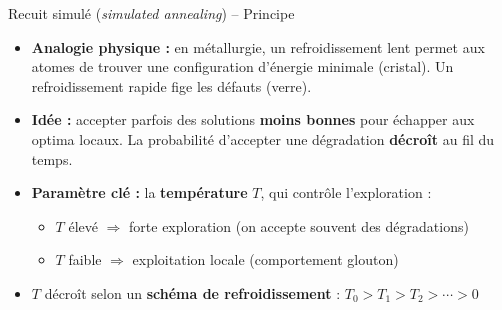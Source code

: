\documentclass[11pt,aspectratio=169]{beamer}
\begin{document}
\begin{frame}{Recuit simulé (\textit{simulated annealing}) -- Principe}

\begin{itemize}

\item \textbf{Analogie physique :} en métallurgie, un refroidissement lent permet aux atomes de trouver une configuration d'énergie minimale (cristal). Un refroidissement rapide fige les défauts (verre).\newline

\item \textbf{Idée :} accepter parfois des solutions \textbf{moins bonnes} pour échapper aux optima locaux. La probabilité d'accepter une dégradation \textbf{décroît} au fil du temps.\newline

\item \textbf{Paramètre clé :} la \textbf{température} $T$, qui contrôle l'exploration :
  \begin{itemize}
    \item $T$ élevé $\Rightarrow$ forte exploration (on accepte souvent des dégradations)\newline
    \item $T$ faible $\Rightarrow$ exploitation locale (comportement glouton)\newline
  \end{itemize}

\item $T$ décroît selon un \textbf{schéma de refroidissement} : $T_0 > T_1 > T_2 > \cdots > 0$

\end{itemize}

\end{frame}
\end{document}
